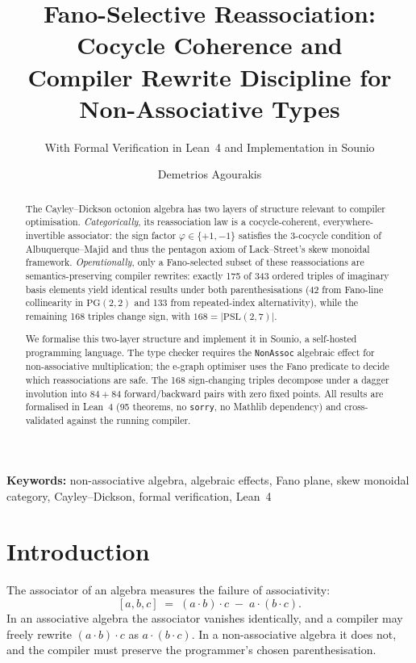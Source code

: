 \documentclass[11pt,a4paper]{article}
\title{Fano-Selective Reassociation: Cocycle Coherence and\\Compiler Rewrite Discipline for Non-Associative Types}
\subtitle{With Formal Verification in Lean~4 and Implementation in Sounio}
\author{Demetrios Agourakis}
\affiliation{%
  \institution{PUC-SP / S\~{a}o Leopoldo Mandic}
  \country{Brazil}
}
\newcommand{\keywords}[1]{\par\smallskip\noindent\textbf{Keywords:} #1}
\theoremstyle{definition}
\theoremstyle{remark}
\newcommand{\PG}{\mathrm{PG}}
\newcommand{\PSL}{\mathrm{PSL}}
\begin{document}
\maketitle

\begin{abstract}
The Cayley--Dickson octonion algebra has two layers of structure
relevant to compiler optimisation.
\emph{Categorically}, its reassociation law is a cocycle-coherent,
everywhere-invertible associator: the sign factor
$\varphi \in \{+1,-1\}$ satisfies the 3-cocycle condition of
Albuquerque--Majid and thus the pentagon axiom of Lack--Street's
skew monoidal framework.
\emph{Operationally}, only a Fano-selected subset of these
reassociations are semantics-preserving compiler rewrites: exactly
175 of 343 ordered triples of imaginary basis elements yield
identical results under both parenthesisations (42 from Fano-line
collinearity in $\PG(2,2)$ and 133 from repeated-index
alternativity), while the remaining 168 triples change sign, with
$168 = |\PSL(2,7)|$.

We formalise this two-layer structure and implement it in Sounio,
a self-hosted programming language. The type checker requires the
\texttt{NonAssoc} algebraic effect for non-associative
multiplication; the e-graph optimiser uses the Fano predicate to
decide which reassociations are safe. The 168 sign-changing triples
decompose under a dagger involution into $84 + 84$
forward/backward pairs with zero fixed points. All results are
formalised in Lean~4 (95 theorems, no \texttt{sorry}, no Mathlib
dependency) and cross-validated against the running compiler.
\end{abstract}

\keywords{non-associative algebra, algebraic effects, Fano plane,
  skew monoidal category, Cayley--Dickson, formal verification, Lean~4}

\section{Introduction}\label{sec:intro}

The associator of an algebra measures the failure of associativity:
\[
  [a, b, c] \;=\; (a \cdot b) \cdot c \;-\; a \cdot (b \cdot c).
\]
In an associative algebra the associator vanishes identically, and a
compiler may freely rewrite $(a \cdot b) \cdot c$ as $a \cdot (b \cdot c)$.
In a non-associative algebra it does not, and the compiler must
preserve the programmer's chosen parenthesisation.
\end{document}
